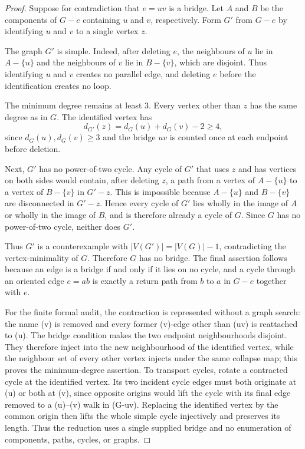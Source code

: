 \documentclass[11pt]{article}
\begin{document}
\begin{proof}
Suppose for contradiction that $e=uv$ is a bridge.  Let $A$ and $B$ be the components of $G-e$ containing $u$ and $v$, respectively.  Form $G'$ from $G-e$ by identifying $u$ and $v$ to a single vertex $z$.

The graph $G'$ is simple.  Indeed, after deleting $e$, the neighbours of $u$ lie in $A-\{u\}$ and the neighbours of $v$ lie in $B-\{v\}$, which are disjoint.  Thus identifying $u$ and $v$ creates no parallel edge, and deleting $e$ before the identification creates no loop.

The minimum degree remains at least $3$.  Every vertex other than $z$ has the same degree as in $G$.  The identified vertex has
\[
d_{G'}(z)=d_G(u)+d_G(v)-2\ge4,
\]
since $d_G(u),d_G(v)\ge3$ and the bridge $uv$ is counted once at each endpoint before deletion.

Next, $G'$ has no power-of-two cycle.  Any cycle of $G'$ that uses $z$ and has vertices on both sides would contain, after deleting $z$, a path from a vertex of $A-\{u\}$ to a vertex of $B-\{v\}$ in $G'-z$.  This is impossible because $A-\{u\}$ and $B-\{v\}$ are disconnected in $G'-z$.  Hence every cycle of $G'$ lies wholly in the image of $A$ or wholly in the image of $B$, and is therefore already a cycle of $G$.  Since $G$ has no power-of-two cycle, neither does $G'$.

Thus $G'$ is a counterexample with $|V(G')|=|V(G)|-1$, contradicting the vertex-minimality of $G$.  Therefore $G$ has no bridge.  The final assertion follows because an edge is a bridge if and only if it lies on no cycle, and a cycle through an oriented edge $e=ab$ is exactly a return path from $b$ to $a$ in $G-e$ together with $e$.

For the finite formal audit, the contraction is represented without a graph
search: the name (v) is removed and every former (v)-edge other than
(uv) is reattached to (u).  The bridge condition makes the two endpoint
neighbourhoods disjoint.  They therefore inject into the new neighbourhood of
the identified vertex, while the neighbour set of every other vertex injects
under the same collapse map; this proves the minimum-degree assertion.  To
transport cycles, rotate a contracted cycle at the identified vertex.  Its
two incident cycle edges must both originate at (u) or both at (v), since
opposite origins would lift the cycle with its final edge removed to a
(u)--(v) walk in (G-uv).  Replacing the identified vertex by the common
origin then lifts the whole simple cycle injectively and preserves its length.
Thus the reduction uses a single supplied bridge and no enumeration of
components, paths, cycles, or graphs.
\end{proof}
\end{document}
